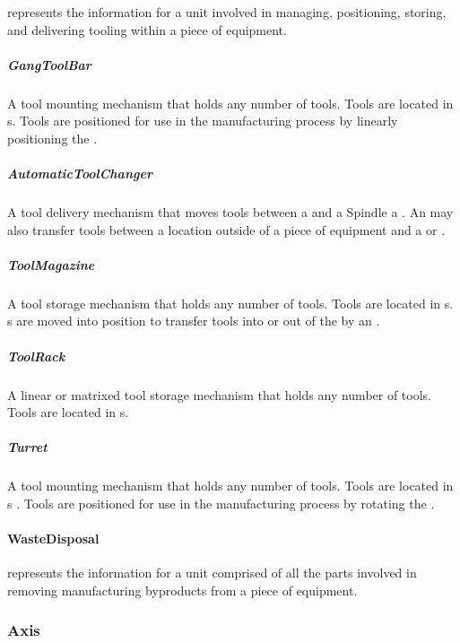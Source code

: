  represents the information for a unit involved in managing, positioning, storing, and delivering tooling within a piece of equipment.



\subparagraph{GangToolBar}\mbox{}
\label{sec:GangToolBar}


A tool mounting mechanism that holds any number of tools. Tools are located in s. Tools are positioned for use in the manufacturing process by linearly positioning the .


\subparagraph{AutomaticToolChanger}\mbox{}
\label{sec:AutomaticToolChanger}


A tool delivery mechanism that moves tools between a  and a \gls{Spindle} a . An  may also transfer tools between a location outside of a piece of equipment and a  or .


\subparagraph{ToolMagazine}\mbox{}
\label{sec:ToolMagazine}


A tool storage mechanism that holds any number of tools. Tools are located in s. s are moved into position to transfer tools into or out of the  by an .


\subparagraph{ToolRack}\mbox{}
\label{sec:ToolRack}


A linear or matrixed tool storage mechanism that holds any number of tools. Tools are located in s.


\subparagraph{Turret}\mbox{}
\label{sec:Turret}


A tool mounting mechanism that holds any number of tools. Tools are located in s . Tools are positioned for use in the manufacturing process by rotating the .


\paragraph{WasteDisposal}\mbox{}
\label{sec:WasteDisposal}


 represents the information for a unit comprised of all the parts involved in removing manufacturing byproducts from a piece of equipment.



\subsubsection{Axis}
\label{sec:Axis}



